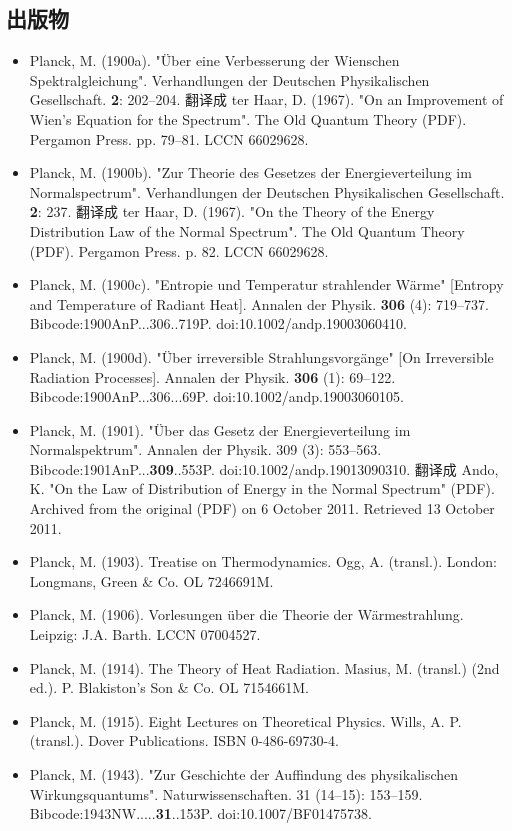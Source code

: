 \subsection{出版物}
\begin{itemize}
\item Planck, M. (1900a). "Über eine Verbesserung der Wienschen Spektralgleichung". Verhandlungen der Deutschen Physikalischen Gesellschaft. \textbf{2}: 202–204. 翻译成 ter Haar, D. (1967). "On an Improvement of Wien's Equation for the Spectrum". The Old Quantum Theory (PDF). Pergamon Press. pp. 79–81. LCCN 66029628.
\item Planck, M. (1900b). "Zur Theorie des Gesetzes der Energieverteilung im Normalspectrum". Verhandlungen der Deutschen Physikalischen Gesellschaft. \textbf{2}: 237. 翻译成 ter Haar, D. (1967). "On the Theory of the Energy Distribution Law of the Normal Spectrum". The Old Quantum Theory (PDF). Pergamon Press. p. 82. LCCN 66029628.
\item Planck, M. (1900c). "Entropie und Temperatur strahlender Wärme" [Entropy and Temperature of Radiant Heat]. Annalen der Physik. \textbf{306} (4): 719–737. Bibcode:1900AnP...306..719P. doi:10.1002/andp.19003060410.
\item Planck, M. (1900d). "Über irreversible Strahlungsvorgänge" [On Irreversible Radiation Processes]. Annalen der Physik. \textbf{306} (1): 69–122. Bibcode:1900AnP...306...69P. doi:10.1002/andp.19003060105.
\item Planck, M. (1901). "Über das Gesetz der Energieverteilung im Normalspektrum". Annalen der Physik. 309 (3): 553–563. Bibcode:1901AnP...\textbf{309}..553P. doi:10.1002/andp.19013090310. 翻译成 Ando, K. "On the Law of Distribution of Energy in the Normal Spectrum" (PDF). Archived from the original (PDF) on 6 October 2011. Retrieved 13 October 2011.
\item Planck, M. (1903). Treatise on Thermodynamics. Ogg, A. (transl.). London: Longmans, Green & Co. OL 7246691M.
\item Planck, M. (1906). Vorlesungen über die Theorie der Wärmestrahlung. Leipzig: J.A. Barth. LCCN 07004527.
\item Planck, M. (1914). The Theory of Heat Radiation. Masius, M. (transl.) (2nd ed.). P. Blakiston's Son & Co. OL 7154661M.
\item Planck, M. (1915). Eight Lectures on Theoretical Physics. Wills, A. P. (transl.). Dover Publications. ISBN 0-486-69730-4.
\item Planck, M. (1943). "Zur Geschichte der Auffindung des physikalischen Wirkungsquantums". Naturwissenschaften. 31 (14–15): 153–159. Bibcode:1943NW.....\textbf{31}..153P. doi:10.1007/BF01475738.
\end{itemize}

